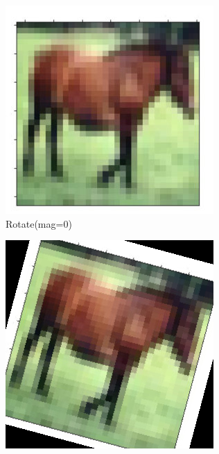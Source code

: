\documentclass[onecolumn]{ujarticle}   %
\begin{document}
\begin{figure}[h]
      \begin{subfigure}{0.3\columnwidth}
        \centering
        \includegraphics[width=1.0\columnwidth]{transform_test/Rotate_0.png}
        \caption{Rotate(mag=0)}
        \label{fig:Rotate_0}
      \end{subfigure}
      \begin{subfigure}{0.3\columnwidth}
        \centering
        \includegraphics[width=1.0\columnwidth]{transform_test/Rotate_15.png}

\end{subfigure}
\end{figure}
\end{document}
